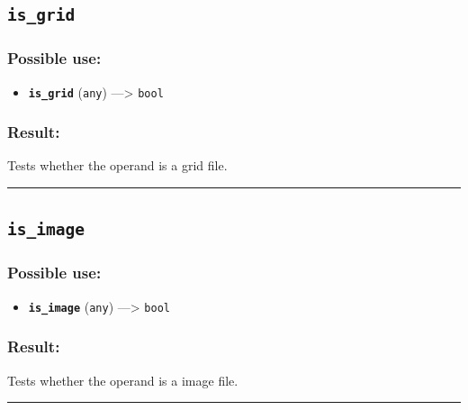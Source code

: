 \documentclass[]{book}
\providecommand{\tightlist}{%
  \setlength{\itemsep}{0pt}\setlength{\parskip}{0pt}}
\theoremstyle{definition}
\theoremstyle{definition}
\theoremstyle{definition}
\theoremstyle{remark}
\begin{document}
\subsection{\texorpdfstring{\texttt{is\_grid}}{is\_grid}}\label{is_grid}

\subsubsection{Possible use:}\label{possible-use-293}

\begin{itemize}
\tightlist
\item
  \textbf{\texttt{is\_grid}} (\texttt{any}) ---\textgreater{}
  \texttt{bool}
\end{itemize}

\subsubsection{Result:}\label{result-283}

Tests whether the operand is a grid file.

\begin{center}\rule{0.5\linewidth}{\linethickness}\end{center}

\subsection{\texorpdfstring{\texttt{is\_image}}{is\_image}}\label{is_image}

\subsubsection{Possible use:}\label{possible-use-294}

\begin{itemize}
\tightlist
\item
  \textbf{\texttt{is\_image}} (\texttt{any}) ---\textgreater{}
  \texttt{bool}
\end{itemize}

\subsubsection{Result:}\label{result-284}

Tests whether the operand is a image file.

\begin{center}\rule{0.5\linewidth}{\linethickness}\end{center}
\end{document}
